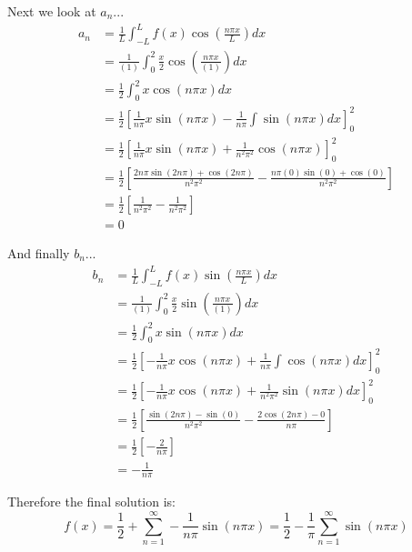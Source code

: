 \documentclass[letterpaper,8pt]{article}
\begin{document}
Next we look at $a_n$...
\begin{align*}
a_n &= \frac{1}{L}  \int_{-L}^L f(x) \cos \left( \frac{n\pi x}{L} \right) dx \\
    &= \frac{1}{(1)} \int_0^2 \frac{x}{2} \cos \left( \frac{n\pi x}{(1)} \right) dx \\
    &= \frac{1}{2} \int_0^2 x \cos \left( n\pi x \right) dx \\
    &= \frac{1}{2} \left[ \frac{1}{n\pi} x \sin \left( n\pi x \right) - \frac{1}{n\pi} \int \sin \left( n\pi x \right) dx \right]^2_0 \\
    &= \frac{1}{2} \left[ \frac{1}{n\pi} x \sin \left( n\pi x \right) + \frac{1}{n^2\pi^2} \cos \left( n\pi x \right) \right]^2_0 \\
    &= \frac{1}{2} \left[ \frac{2n\pi \sin \left( 2n\pi \right) + \cos \left( 2n\pi \right)}{n^2\pi^2} - \frac{n\pi (0) \sin \left(0 \right) + \cos \left( 0 \right)}{n^2\pi^2} \right] \\
    &= \frac{1}{2} \left[ \frac{1}{n^2\pi^2} - \frac{1}{n^2\pi^2} \right] \\
    &= 0
\end{align*}

And finally $b_n$...
\begin{align*}
b_n &= \frac{1}{L} \int_{-L}^L f(x) \sin \left( \frac{n\pi x}{L} \right) dx \\
    &= \frac{1}{(1)} \int_0^2 \frac{x}{2} \sin \left( \frac{n\pi x}{(1)} \right) dx \\
    &= \frac{1}{2} \int_0^2 x \sin \left( n\pi x \right) dx \\
    &= \frac{1}{2} \left[ - \frac{1}{n\pi} x \cos \left( n\pi x \right) + \frac{1}{n\pi} \int \cos \left( n\pi x \right) dx \right]^2_0 \\
    &= \frac{1}{2} \left[ - \frac{1}{n\pi} x \cos \left( n\pi x \right) + \frac{1}{n^2\pi^2} \sin \left( n\pi x \right) dx \right]^2_0 \\
    &= \frac{1}{2} \left[ \frac{\sin (2n\pi) - \sin(0)}{ n^2\pi^2 } - \frac{2\cos(2n\pi) - 0 }{n\pi} \right] \\
    &= \frac{1}{2} \left[ -\frac{2}{n\pi} \right] \\
    &= - \frac{1}{n\pi}
\end{align*}

Therefore the final solution is:
\[
f(x) = \frac{1}{2} + \sum_{n=1}^\infty -\frac{1}{n\pi} \sin (n\pi x) = \frac{1}{2} - \frac{1}{\pi} \sum_{n=1}^\infty \sin (n\pi x)
\]


\end{document}
